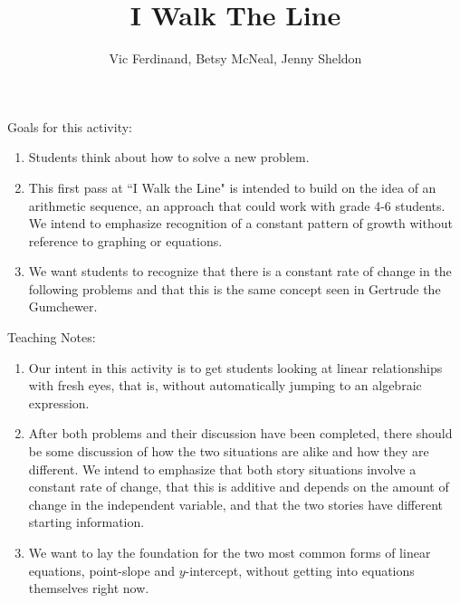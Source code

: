 \documentclass{ximera}
\title{I Walk The Line}
\author{Vic Ferdinand, Betsy McNeal, Jenny Sheldon}
\begin{document}
\begin{abstract}
\end{abstract}
\maketitle

\begin{instructorIntro}
Goals for this activity:
\begin{enumerate}
\item Students think about how to solve a new problem.
\item  This first pass at ``I Walk the Line" is intended to build on the idea of an arithmetic sequence, an approach that could work with grade 4-6 students.  We intend to emphasize  recognition of a constant pattern of growth without reference to graphing or equations.
\item We want students to recognize that there is a constant rate of change in the following problems and that this is the same concept seen in Gertrude the Gumchewer.
\end{enumerate}

Teaching Notes:
\begin{enumerate}
\item Our intent in this activity is to get students looking at linear relationships with fresh eyes, that is, without automatically jumping to an algebraic expression. 
\item  After both problems and their discussion have been completed, there should be some discussion of how the two situations are alike and how they are different.  We intend to emphasize that both story situations involve a constant rate of change, that this is additive and depends on the amount of change in the independent variable, and that the two stories have different starting information.  
\item  We want to lay the foundation for the two most common forms of linear equations, point-slope and $y$-intercept, without getting into equations themselves right now.  
\end{enumerate}
\end{instructorIntro}
\end{document}
